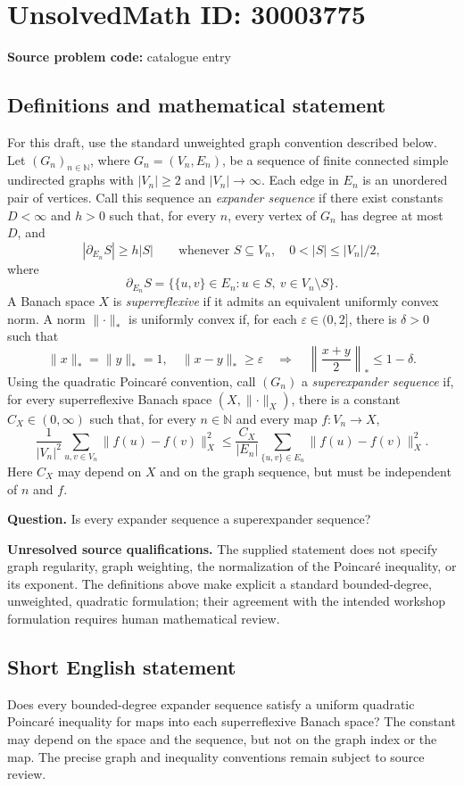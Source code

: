 \documentclass[11pt]{article}
\newcommand{\N}{\mathbb{N}}
\begin{document}
\section*{UnsolvedMath ID: 30003775}
\textbf{Source problem code:} catalogue entry
\subsection{Definitions and mathematical statement}
For this draft, use the standard unweighted graph convention described below. Let \((G_n)_{n\in\N}\), where \(G_n=(V_n,E_n)\), be a sequence of finite connected simple undirected graphs with \(|V_n|\ge 2\) and \(|V_n|\to\infty\). Each edge in \(E_n\) is an unordered pair of vertices. Call this sequence an \emph{expander sequence} if there exist constants \(D<\infty\) and \(h>0\) such that, for every \(n\), every vertex of \(G_n\) has degree at most \(D\), and
\[
 |\partial_{E_n}S|\ge h|S|
 \qquad\text{whenever }S\subseteq V_n,\quad 0<|S|\le |V_n|/2,
\]
where
\[
 \partial_{E_n}S=\{\{u,v\}\in E_n:u\in S,\ v\in V_n\setminus S\}.
\]
A Banach space \(X\) is \emph{superreflexive} if it admits an equivalent uniformly convex norm. A norm \(\lVert\cdot\rVert_*\) is uniformly convex if, for each \(\varepsilon\in(0,2]\), there is \(\delta>0\) such that
\[
 \lVert x\rVert_*=\lVert y\rVert_*=1,
 \quad \lVert x-y\rVert_*\ge\varepsilon
 \quad\Longrightarrow\quad
 \left\lVert\frac{x+y}{2}\right\rVert_*\le 1-\delta.
\]
Using the quadratic Poincar\'e convention, call \((G_n)\) a \emph{superexpander sequence} if, for every superreflexive Banach space \((X,\lVert\cdot\rVert_X)\), there is a constant \(C_X\in(0,\infty)\) such that, for every \(n\in\N\) and every map \(f:V_n\to X\),
\[
 \frac{1}{|V_n|^2}\sum_{u,v\in V_n}
 \lVert f(u)-f(v)\rVert_X^2
 \le
 \frac{C_X}{|E_n|}\sum_{\{u,v\}\in E_n}
 \lVert f(u)-f(v)\rVert_X^2.
\]
Here \(C_X\) may depend on \(X\) and on the graph sequence, but must be independent of \(n\) and \(f\).

\textbf{Question.} Is every expander sequence a superexpander sequence?

\textbf{Unresolved source qualifications.} The supplied statement does not specify graph regularity, graph weighting, the normalization of the Poincar\'e inequality, or its exponent. The definitions above make explicit a standard bounded-degree, unweighted, quadratic formulation; their agreement with the intended workshop formulation requires human mathematical review.
\subsection{Short English statement}
Does every bounded-degree expander sequence satisfy a uniform quadratic Poincar\'e inequality for maps into each superreflexive Banach space? The constant may depend on the space and the sequence, but not on the graph index or the map. The precise graph and inequality conventions remain subject to source review.
\end{document}
